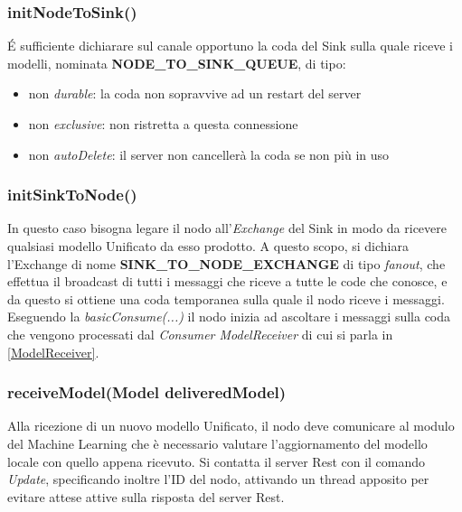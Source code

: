       \subsubsection{initNodeToSink()}
        \'E sufficiente dichiarare sul canale opportuno la coda del Sink sulla quale riceve i modelli, nominata \textbf{NODE\_TO\_SINK\_QUEUE}, di tipo:
        \begin{itemize}
          \item non \textit{durable}: la coda non sopravvive ad un restart del server
          \item non \textit{exclusive}: non ristretta a questa connessione
          \item non \textit{autoDelete}: il server non cancellerà la coda se non più in uso
        \end{itemize}
        

      \subsubsection{initSinkToNode()}
        In questo caso bisogna legare il nodo all'\textit{Exchange} del Sink in modo da ricevere qualsiasi modello Unificato da esso prodotto. A questo scopo, si dichiara l'Exchange di nome \textbf{SINK\_TO\_NODE\_EXCHANGE} di tipo \textit{fanout}, che effettua il broadcast di tutti i messaggi che riceve a tutte le code che conosce, e da questo si ottiene una coda temporanea sulla quale il nodo riceve i messaggi. Eseguendo la \textit{basicConsume(...)} il nodo inizia ad ascoltare i messaggi sulla coda che vengono processati dal \textit{Consumer ModelReceiver} di cui si parla in \ref{ModelReceiver}.
        

      \subsubsection{receiveModel(Model deliveredModel)}
        Alla ricezione di un nuovo modello Unificato, il nodo deve comunicare al modulo del Machine Learning che è necessario valutare l'aggiornamento del modello locale con quello appena ricevuto. Si contatta il server Rest con il comando \textit{Update}, specificando inoltre l'ID del nodo, attivando un thread apposito per evitare attese attive sulla risposta del server Rest.
        

